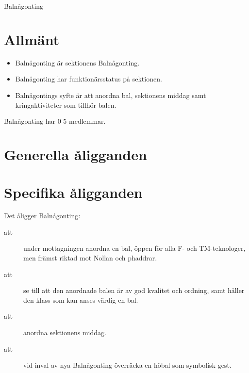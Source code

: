 \documentclass[a4paper]{article}
\begin{document}
\renewcommand{\forening}{Balnågonting} %

\begin{foreningenv}{\forening{}} %
    \section{Allmänt}
    \begin{itemize}
        \item Balnågonting är sektionens Balnågonting.
        \item Balnågonting har funktionärsstatus på sektionen.
        \item Balnågontings syfte är att anordna bal, sektionens middag samt kringaktiviteter som tillhör balen. %
    \end{itemize}
    Balnågonting har 0-5 medlemmar. %
    
    \section{Generella åligganden}
    \aliggsektfunkt{} %
        
    \section{Specifika åligganden}
    Det åligger \forening{}:
    \begin{description}
          \item[att] under mottagningen anordna en bal, öppen för alla F- och TM-teknologer, men främst riktad mot Nollan och phaddrar.
          \item[att] se till att den anordnade balen är av god kvalitet och ordning, samt håller den klass som kan anses värdig en bal.
          \item[att] anordna sektionens middag.
          \item[att] vid inval av nya Balnågonting överräcka en höbal som symbolisk gest.
    \end{description}
\end{foreningenv}
\end{document}
